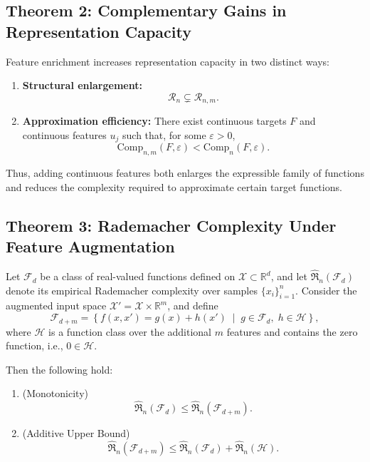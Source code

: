 \documentclass{article}
\newtheorem{theorem}{Theorem}
\begin{document}

\subsection{Theorem 2: Complementary Gains in Representation Capacity}
\label{AppenB_Th2}
Feature enrichment increases representation capacity in two distinct ways:

\begin{enumerate}
    \item \textbf{Structural enlargement:}
    \[
    \mathcal{R}_{n} \subsetneq \mathcal{R}_{n,m}.
    \]

    \item \textbf{Approximation efficiency:}
    There exist continuous targets \(F\) and continuous features \(u_j\)
    such that, for some \(\varepsilon>0\),
    \[
    \mathrm{Comp}_{n,m}(F,\varepsilon)
    <
    \mathrm{Comp}_{n}(F,\varepsilon).
    \]
\end{enumerate}
\noindent
Thus, adding continuous features both enlarges the expressible family
of functions and reduces the complexity required to approximate
certain target functions.


\subsection{Theorem 3: Rademacher Complexity Under Feature Augmentation}
\label{AppenB_Th3}
Let $\mathcal{F}_d$ be a class of real-valued functions defined on 
$\mathcal{X} \subset \mathbb{R}^d$, and let $\hat{\mathfrak{R}}_n(\mathcal{F}_d)$ 
denote its empirical Rademacher complexity over samples 
$\{x_i\}_{i=1}^n$. Consider the augmented input space 
$\mathcal{X}' = \mathcal{X} \times \mathbb{R}^m$, and define
\[
\mathcal{F}_{d+m}
=
\left\{
f(x,x') = g(x) + h(x') 
\;\middle|\;
g \in \mathcal{F}_d,\;
h \in \mathcal{H}
\right\},
\]
where $\mathcal{H}$ is a function class over the additional $m$ features 
and contains the zero function, i.e., $0 \in \mathcal{H}$.

Then the following hold:

\begin{enumerate}
    \item (Monotonicity)
    \[
    \hat{\mathfrak{R}}_n(\mathcal{F}_d)
    \le
    \hat{\mathfrak{R}}_n(\mathcal{F}_{d+m}).
    \]

    \item (Additive Upper Bound)
    \[
    \hat{\mathfrak{R}}_n(\mathcal{F}_{d+m})
    \le
    \hat{\mathfrak{R}}_n(\mathcal{F}_d)
    +
    \hat{\mathfrak{R}}_n(\mathcal{H}).
    \]
\end{enumerate}
\end{document}
